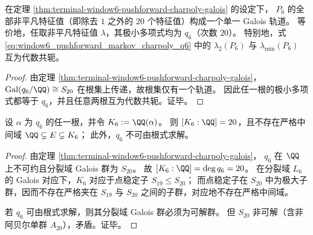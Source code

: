 \begin{corollary}\label{cor:terminal-window6-pushforward-single-galois-orbit}
在定理 \ref{thm:terminal-window6-pushforward-charpoly-galois} 的设定下，
\(P_6\) 的全部非平凡特征值（即除去 \(1\) 之外的 \(20\) 个特征值）构成一个单一 Galois 轨道。
等价地，任取非平凡特征值 \(\lambda\)，其极小多项式均为 \(q_6\)（次数 \(20\)）。
特别地，式 \eqref{eq:window6_pushforward_markov_charpoly_q6} 中的
\(\lambda_2(P_6)\) 与 \(\lambda_{\min}(P_6)\) 互为代数共轭。
\end{corollary}
\begin{proof}
由定理 \ref{thm:terminal-window6-pushforward-charpoly-galois}，
\(\mathrm{Gal}(q_6/\QQ)\cong S_{20}\) 在根集上传递，故根集仅有一个轨道。
因此任一根的极小多项式都等于 \(q_6\)，并且任意两根互为代数共轭。证毕。
\end{proof}


\begin{corollary}[根域的原始性与不可根式求解]\label{cor:terminal-window6-q6-root-field-primitive-nonsolvable}
设 \(\alpha\) 为 \(q_6\) 的任一根，并令 \(K_6:=\QQ(\alpha)\)。
则 \([K_6:\QQ]=20\)，且不存在严格中间域
\(
\QQ\subsetneq E\subsetneq K_6
\)；
此外，\(q_6\) 不可由根式求解。
\end{corollary}
\begin{proof}
由定理 \ref{thm:terminal-window6-pushforward-charpoly-galois}，
\(q_6\) 在 \(\QQ\) 上不可约且分裂域 Galois 群为 \(S_{20}\)。
故 \([K_6:\QQ]=\deg q_6=20\)。
在分裂域 \(L_6\) 的 Galois 对应下，\(K_6\) 对应于点稳定子 \(S_{19}\le S_{20}\)；
而点稳定子在 \(S_{20}\) 中为极大子群，因而不存在严格夹在 \(S_{19}\) 与 \(S_{20}\) 之间的子群，对应地不存在严格中间域。

若 \(q_6\) 可由根式求解，则其分裂域 Galois 群必须为可解群。
但 \(S_{20}\) 非可解（含非阿贝尔单群 \(A_{20}\)），矛盾。证毕。
\end{proof}

